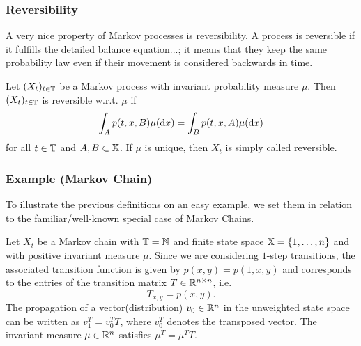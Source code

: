 \subsubsection*{Reversibility}

A very nice property of Markov processes is reversibility.
A process is reversible if it fulfills the detailed balance equation...;
it means that they keep the same probability law even if their movement is considered backwards in time.


\begin{defi}
Let $(X_t)_{t\in\mathbb{T}}$ be a Markov process with invariant probability measure $\mu$. Then $(X_t)_{t\in\mathbb{T}}$ is reversible w.r.t. $\mu$ if
\begin{equation}
\int_A p(t,x,B) \mu(\mathop{}\!\mathrm{d} x) = \int_B p(t,x,A) \mu(\mathop{}\!\mathrm{d} x)
\end{equation}
for all $t \in \mathbb{T}$ and $A,B \subset \mathbb{X}$. If $\mu$ is unique, then $X_t$ is simply called reversible. 
\end{defi}

\subsubsection*{Example (Markov Chain)}

To illustrate the previous definitions on an easy example, we set them in relation to the familiar/well-known special case of Markov Chains.

Let $X_t$ be a Markov chain with $\mathbb{T} = \mathbb{N}$ and finite state space $\mathbb{X} = \{1,\dots,n\}$ and with positive invariant measure $\mu$. Since we are considering $1$-step transitions, the associated transition function is given by $p(x,y) = p(1,x,y)$ and corresponds to the entries of the transition matrix $T\in \mathbb{R}^{n \times n}$, i.e.
\begin{equation*}
T_{x,y} = p(x,y).
\end{equation*}
The propagation of a vector(distribution) $v_0 \in \mathbb{R}^n$ in the unweighted state space can be written as $v_1^T = v_0^T T$, where $v_0^T$ denotes the transposed vector. 
The invariant measure $\mu \in \mathbb{R}^n$ satisfies $\mu^T = \mu^T T$. 